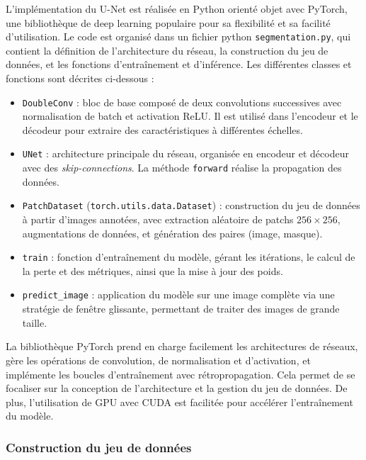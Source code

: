 \documentclass[a4paper,11pt]{article}
\begin{document}
L'implémentation du U-Net est réalisée en Python orienté objet avec PyTorch, une bibliothèque de deep learning populaire pour sa flexibilité et sa facilité d'utilisation. Le code est organisé dans un fichier python \texttt{segmentation.py}, qui contient la définition de l'architecture du réseau, la construction du jeu de données, et les fonctions d'entraînement et d'inférence. Les différentes classes et fonctions sont décrites ci-dessous :

\begin{itemize}
    \item[$\bullet$] \texttt{DoubleConv} : bloc de base composé de deux convolutions successives avec normalisation de batch et activation ReLU. Il est utilisé dans l’encodeur et le décodeur pour extraire des caractéristiques à différentes échelles.

    \item[$\bullet$] \texttt{UNet} : architecture principale du réseau, organisée en encodeur et décodeur avec des \textit{skip-connections}. La méthode \texttt{forward} réalise la propagation des données.

    \item[$\bullet$] \texttt{PatchDataset} (\texttt{torch.utils.data.Dataset}) : construction du jeu de données à partir d’images annotées, avec extraction aléatoire de patchs $256\times256$, augmentations de données, et génération des paires (image, masque).

    \item[$\bullet$] \texttt{train} : fonction d’entraînement du modèle, gérant les itérations, le calcul de la perte et des métriques, ainsi que la mise à jour des poids.

    \item[$\bullet$] \texttt{predict\_image} : application du modèle sur une image complète via une stratégie de fenêtre glissante, permettant de traiter des images de grande taille.
\end{itemize}

La bibliothèque PyTorch prend en charge facilement les architectures de réseaux, gère les opérations de convolution, de normalisation et d'activation, et implémente les boucles d'entraînement avec rétropropagation. Cela permet de se focaliser sur la conception de l'architecture et la gestion du jeu de données. De plus, l'utilisation de GPU avec CUDA est facilitée pour accélérer l'entraînement du modèle.

\subsubsection{Construction du jeu de données}
\end{document}
